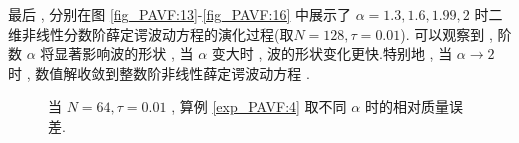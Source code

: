   最后 , 分别在图 \ref{fig_PAVF:13}-\ref{fig_PAVF:16} 中展示了 $\alpha=1.3 , 1.6 , 1.99 , 2$ 时二维非线性分数阶薛定谔波动方程的演化过程(取$N=128 , \tau=0.01$).
  可以观察到 , 阶数 $\alpha$ 将显著影响波的形状 , 当 $\alpha$ 变大时 , 波的形状变化更快.特别地 , 当 $\alpha \rightarrow 2$ 时 , 
  数值解收敛到整数阶非线性薛定谔波动方程 \cite{zhangConservativeNumericalScheme2003,liCompactFiniteDifference2012,wangAnalysisNewConservative2006}.

  \begin{figure}[H]
	\begin{center}
	\vspace{-1.5mm}
	\caption{当  $N = 64 , \tau=0.01$ , 算例 \ref{exp_PAVF:4} 取不同 $\alpha$ 时的相对质量误差.}
	\label{fig_PAVF:11}
	\end{center}
	\end{figure}
	
